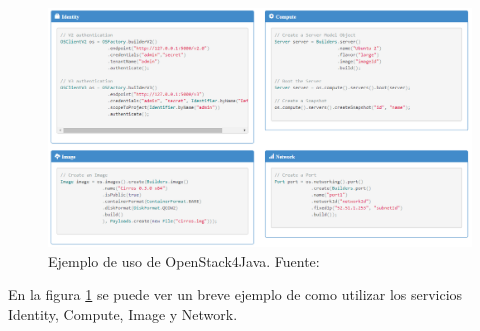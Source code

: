 \begin{figure}[!ht]
	\centering
	\includegraphics[width=1\linewidth]{imagenes/ejemplo_os4j}
	\caption{Ejemplo de uso de OpenStack4Java. Fuente:\cite{openstack4jbib}}
	\label{fig:ejemploos4j}
\end{figure}

En la figura \ref{fig:ejemploos4j} se puede ver un breve ejemplo de como utilizar los servicios Identity, Compute, Image y Network.


\cleardoublepage
